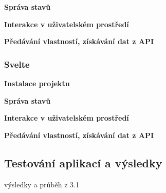 \begin{flushleft}
  \textbf{Správa stavů}
\end{flushleft}

\begin{flushleft}
  \textbf{Interakce v uživatelském prostředí}
\end{flushleft}

\begin{flushleft}
  \textbf{Předávání vlastností, získávání dat z API}
\end{flushleft}


\subsubsection{Svelte}

\begin{flushleft}
  \textbf{Instalace projektu}
\end{flushleft}

\begin{flushleft}
  \textbf{Správa stavů}
\end{flushleft}

\begin{flushleft}
  \textbf{Interakce v uživatelském prostředí}
\end{flushleft}

\begin{flushleft}
  \textbf{Předávání vlastností, získávání dat z API}
\end{flushleft}


\subsection{Testování aplikací a výsledky}

\begin{citemize}
	\item výsledky a průběh z 3.1
\end{citemize}

